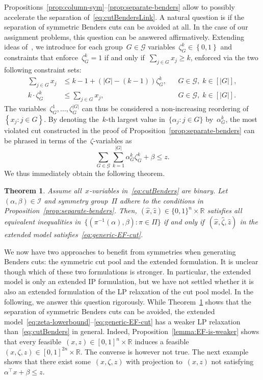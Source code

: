 \documentclass[a4paper,10pt]{article}
\newcommand{\R}{\mathds{R}}
\newcommand{\B}[1]{\{0,1\}^{#1}}
\newcommand{\fixed}[1]{\hat{ #1 }}
\newcommand{\sprod}[2]{#1^\top #2}
\newcommand{\brackets}[1]{\left\{ #1 \right\}}
\newtheorem{theorem}{Theorem}
\theoremstyle{definition}
\begin{document}
Propositions~\ref{prop:column-sym}--\ref{prop:separate-benders} allow to possibly accelerate the separation of~\eqref{eq:cutBendersLink}.
A natural question is if the separation of symmetric Benders cuts can be avoided at all.
In the case of our assignment problems, this question can be answered affirmatively.
Extending ideas of~\cite{riise2016recursive}, we introduce for each group~$G \in \mathcal{G}$ variables~$\zeta^k_{G}\in \brackets{0, 1}$ and constraints that enforce~$\zeta^k_{G} = 1$ if and only if~$\sum_{j\in G} x_{j} \geq k$, enforced via the two following constraint sets:
%
\begin{align}
  \sum_{j \in G} x_j &\leq k - 1 + \left(|G| - (k - 1)\right)\zeta^k_G, && G \in \mathcal{G},\; k \in [|G|],\label{eq:zeta-lowerbound}\\
  k \cdot \zeta^k_G &\leq \sum_{j \in G} x_j, && G \in \mathcal{G},\; k \in [|G|].\label{eq:zeta-upperbound}
\end{align}
%
The variables~$\zeta^1_{G}, \dots, \zeta^{|G|}_{G}$ can thus be considered a non-increasing reordering of~$\brackets{x_{j}: j \in G}$.
By denoting the~$k$-th largest value in~$\{\alpha_j : j \in G\}$ by~$\alpha^k_{G}$, the most violated cut constructed in the proof of Proposition~\ref{prop:separate-benders} can be phrased in terms of the~$\zeta$-variables as
%
\begin{equation}
  \sum_{G\in \mathcal{G}} \sum_{k = 1}^{|G|} \alpha^k_{G} \zeta^k_{G} +\beta \leq z. \label{eq:generic-EF-cut}
\end{equation}
%
We thus immediately obtain the following theorem.
%
\begin{theorem}
  \label{thm:EF-works}
  Assume all~$x$-variables in~\eqref{eq:cutBenders} are binary.
  Let~$(\alpha,\beta) \in \mathcal{I}$ and symmetry group~$\Pi$ adhere to the conditions in Proposition~\ref{prop:separate-benders}.
  Then, $(\fixed{x},\fixed{z}) \in \B{n} \times \R$ satisfies all equivalent inequalities in~$\{(\pi^{-1}(\alpha),\beta) : \pi \in \Pi\}$ if and only if~$(\fixed{x},\fixed{\zeta},\fixed{z})$ in the extended model satisfies~\eqref{eq:generic-EF-cut}.
\end{theorem}
%

We now have two approaches to benefit from symmetries when generating Benders cuts: the symmetric cut pool and the extended formulation.
It is unclear though which of these two formulations is stronger.
In particular, the extended model is only an extended IP formulation, but we have not settled whether it is also an extended formulation of the LP relaxation of the cut pool model.
In the following, we answer this question rigorously.
While Theorem~\ref{thm:EF-works} shows that the separation of symmetric Benders cuts can be avoided, the extended model~\eqref{eq:zeta-lowerbound}--\eqref{eq:generic-EF-cut} has a weaker LP relaxation than~\eqref{eq:cutBenders} in general.
Indeed, Proposition~\ref{lemma:EF-is-weaker} shows that every feasible~$(x, z)\in [0,1]^{n}\times\R$ induces a feasible~$(x, \zeta, z)\in[0,1]^{2n}\times\R$.
The converse is however not true.
The next example shows that there exist some~$(x,\zeta, z)$ with projection to~$(x,z)$ not satisfying~$\sprod{\alpha}{x} + \beta \leq z$.
\end{document}

